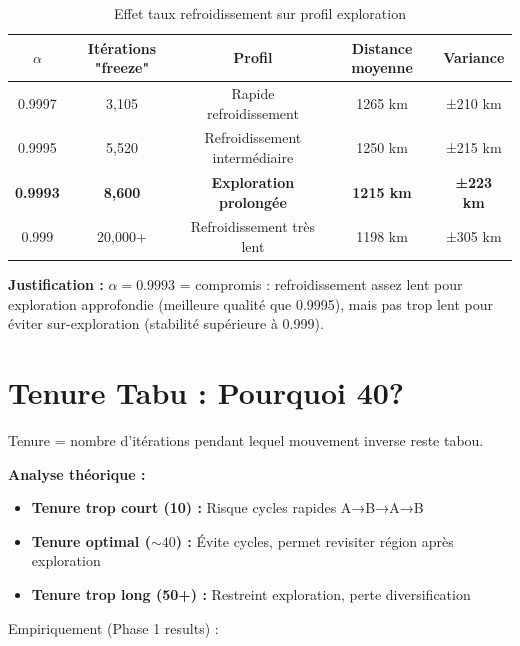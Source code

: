 \documentclass[12pt,a4paper,twoside]{report}
\begin{document}
\begin{table}[H]
    \centering
    \caption{Effet taux refroidissement sur profil exploration}
    \begin{tabular}{|c|c|c|c|c|}
        \hline
        \textbf{$\alpha$} & \textbf{Itérations "freeze"} & \textbf{Profil}                & \textbf{Distance moyenne} & \textbf{Variance} \\
        \hline
        0.9997            & 3,105                        & Rapide refroidissement         & 1265 km                   & ±210 km           \\
        0.9995            & 5,520                        & Refroidissement intermédiaire  & 1250 km                   & ±215 km           \\
        \textbf{0.9993}   & \textbf{8,600}               & \textbf{Exploration prolongée} & \textbf{1215 km}          & \textbf{±223 km}  \\
        0.999             & 20,000+                      & Refroidissement très lent      & 1198 km                   & ±305 km           \\
        \hline
    \end{tabular}
\end{table}

\textbf{Justification :} $\alpha = 0.9993$ = compromis : refroidissement assez lent pour exploration approfondie (meilleure qualité que 0.9995), mais pas trop lent pour éviter sur-exploration (stabilité supérieure à 0.999).

\section{Tenure Tabu : Pourquoi 40?}

Tenure = nombre d'itérations pendant lequel mouvement inverse reste tabou.

\textbf{Analyse théorique :}
\begin{itemize}
    \item \textbf{Tenure trop court (10) :} Risque cycles rapides A→B→A→B
    \item \textbf{Tenure optimal ($\sim 40$) :} Évite cycles, permet revisiter région après exploration
    \item \textbf{Tenure trop long (50+) :} Restreint exploration, perte diversification
\end{itemize}

Empiriquement (Phase 1 results) :
\end{document}
